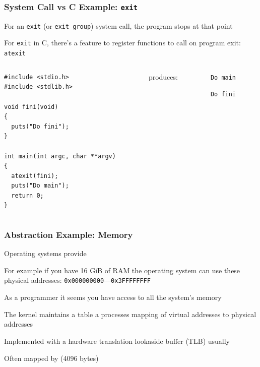 \documentclass[aspectratio=169]{beamer}
\begin{document}
  \begin{frame}[fragile]
    \frametitle{System Call vs C Example: \texttt{exit}}

    For an \texttt{exit} (or \texttt{exit\_group}) system call, the program
    stops at that point

    \vspace{1em}

    For \texttt{exit} in C, there's a feature to register functions to call
    on program exit: \texttt{atexit}

    \vspace{1em}

    \begin{columns}
      \begin{column}{0.4\textwidth}
        \begin{lstlisting}[basicstyle=\ttfamily\footnotesize]
#include <stdio.h>
#include <stdlib.h>

void fini(void)
{
  puts("Do fini");
}

int main(int argc, char **argv)
{
  atexit(fini);
  puts("Do main");
  return 0;
}
        \end{lstlisting}
      \end{column}
      \begin{column}{0.13\textwidth}
        produces:
      \end{column}
      \begin{column}{0.13\textwidth}
        \texttt{Do main}

        \texttt{Do fini}
      \end{column}
    \end{columns}
  \end{frame}

  \begin{frame}
    \frametitle{Abstraction Example: Memory}

    Operating systems provide 

    \vspace{1em}

    For example if you have 16 GiB of RAM the operating system can use these
    physical addresses: \texttt{0x000000000}---\texttt{0x3FFFFFFFF}

    \vspace{1em}

    As a programmer it seems you have access to all the system's memory

    \vspace{1em}

    The kernel maintains a table a processes mapping of virtual addresses to
    physical addresses

    \hspace{1em} Implemented with a hardware translation lookaside buffer (TLB)
                 usually

    \hspace{1em} Often mapped by  (4096 bytes)
  \end{frame}
\end{document}
